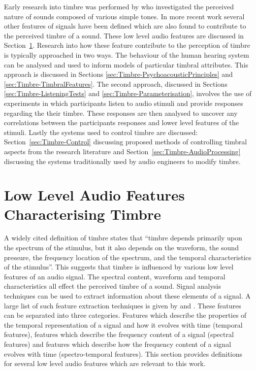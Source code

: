 	Early research into timbre was performed by \citet{helmholtz1875on} who investigated the perceived nature of sounds
	composed of various simple tones. In more recent work several other features of signals have been defined which are
	also found to contribute to the perceived timbre of a sound.  These low level audio features are discussed in
	Section~\ref{sec:Timbre-LowLevelFeatures}.  Research into how these feature contribute to the perception of timbre
	is typically approached in two ways. The behaviour of the human hearing system can be analysed and used to inform
	models of particular timbral attributes.  This approach is discussed in Sections
	\ref{sec:Timbre-PsychoacousticPrinciples} and \ref{sec:Timbre-TimbralFeatures}. The second approach, discussed in
	Sections \ref{sec:Timbre-ListeningTests} and \ref{sec:Timbre-Parameterisation}, involves the use of experiments in
	which participants listen to audio stimuli and provide responses regarding the their timbre.  These responses are
	then analysed to uncover any correlations between the participants responses and lower level features of the
	stimuli. Lastly the systems used to control timbre are discussed: Section~\ref{sec:Timbre-Control} discussing
	proposed methods of controlling timbral aspects from the research literature and
	Section~\ref{sec:Timbre-AudioProcessing} discussing the systems traditionally used by audio engineers to modify
	timbre.

\section{Low Level Audio Features Characterising Timbre}
\label{sec:Timbre-LowLevelFeatures}
	A widely cited definition of timbre \citep{ASA1960american} states that ``timbre depends primarily upon the
	spectrum of the stimulus, but it also depends on the waveform, the sound pressure, the frequency location of the
	spectrum, and the temporal characteristics of the stimulus''. This suggests that timbre is influenced by various
	low level features of an audio signal. The spectral content, waveform and temporal characteristics all effect the
	perceived timbre of a sound. Signal analysis techniques can be used to extract information about these elements of
	a signal.  A large list of such feature extraction techniques is given by \citet{peeters2004a} and
	\citet{bullock2008implementing}. These features can be separated into three categories. Features which describe the
	properties of the temporal representation of a signal and how it evolves with time (temporal features), features
	which describe the frequency content of a signal (spectral features) and features which describe how the frequency
	content of a signal evolves with time (spectro-temporal features). This section provides definitions for several
	low level audio features which are relevant to this work.

